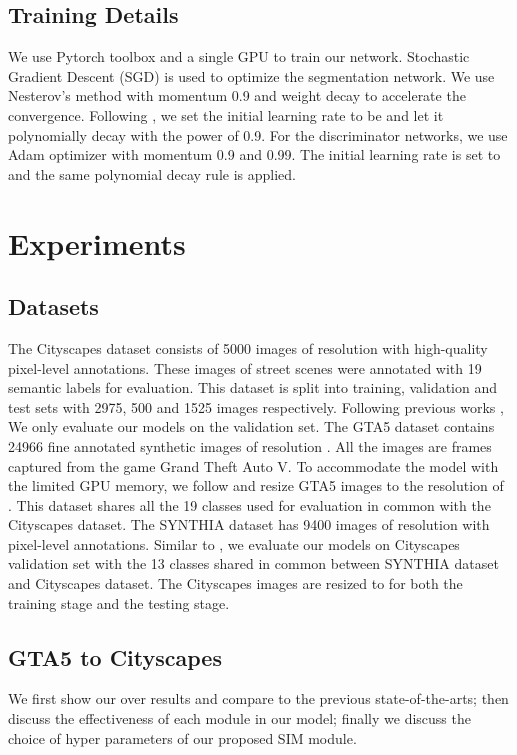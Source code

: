 \documentclass[10pt,twocolumn,letterpaper]{article}
\begin{document}
\subsection{Training Details}
We use Pytorch toolbox and a single GPU to train our network. Stochastic Gradient Descent (SGD) is used to optimize the segmentation network. We use Nesterov's method \cite{Nesterov} with momentum 0.9 and weight decay  to accelerate the convergence. Following \cite{deeplabv1}, we set the initial learning rate to be  and let it polynomially decay with the power of 0.9. For the discriminator networks, we use Adam optimizer \cite{adam} with momentum 0.9 and 0.99. The initial learning rate is set to  and the same polynomial decay rule is applied. 




\section{Experiments}
\subsection{Datasets}
The Cityscapes \cite{cityscapes} dataset consists of 5000 images of resolution  with high-quality pixel-level annotations. These images of street scenes were annotated with 19 semantic labels for evaluation. This dataset is split into training, validation and test sets with 2975, 500 and 1525 images respectively. Following previous works \cite{fcnwild, domainchallenge}, We only evaluate our models on the validation set. The GTA5 \cite{gta} dataset contains 24966 fine annotated synthetic images of resolution . All the images are frames captured from the game Grand Theft Auto V. To accommodate the model with the limited GPU memory, we follow \cite{outputspace} and resize GTA5 images to the resolution of . This dataset shares all the 19 classes used for evaluation in common with the Cityscapes dataset. The SYNTHIA \cite{synthia} dataset has 9400 images of resolution  with pixel-level annotations. Similar to \cite{Luo_2019_CVPR, outputspace,Du_2019_ICCV,bidir}, we evaluate our models on Cityscapes validation set with the 13 classes shared in common between SYNTHIA dataset and Cityscapes dataset. The Cityscapes images are resized to  for both the training stage and the testing stage. 


\subsection{GTA5 to Cityscapes}
\label{section52}
We first show our over results and compare to the previous state-of-the-arts; then discuss the effectiveness of each module in our model; finally we discuss the choice of hyper parameters of our proposed SIM module. 
\end{document}
